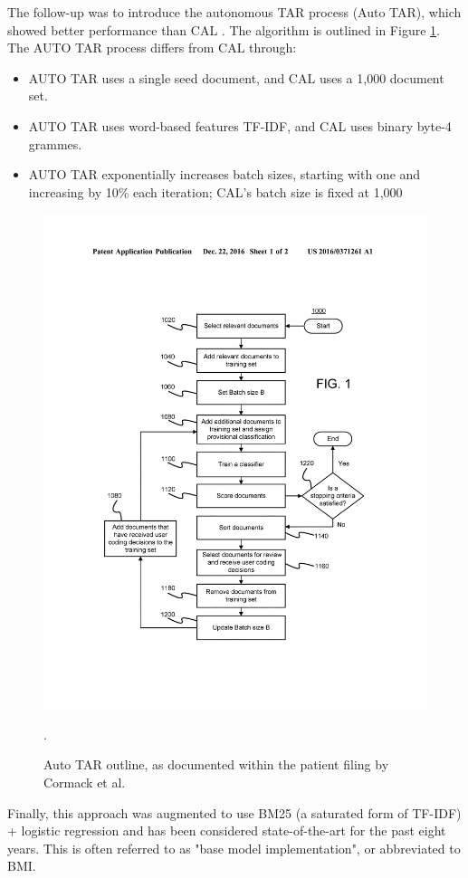 \documentclass[../main.tex]{subfiles}
\begin{document}
The follow-up was to introduce the autonomous TAR process (Auto TAR), which showed better performance than CAL \cite{cormack_autonomy_2015}. The algorithm is outlined in Figure \ref{fig:autotar_process}. 
The AUTO TAR process differs from CAL through:
\begin{itemize}
    \item AUTO TAR uses a single seed document, and CAL uses a 1,000 document set.
    \item AUTO TAR uses word-based features TF-IDF, and CAL uses binary byte-4 grammes.
    \item AUTO TAR exponentially increases batch sizes, starting with one and increasing by 10\% each iteration; CAL's batch size is fixed at 1,000
\end{itemize}

\begin{figure}
    \centering
    \includegraphics[width=1\linewidth]{sections//images/autotar.jpg}
    \caption{Auto TAR outline, as documented within the patient filing by Cormack et al. \cite{cormack_systems_2016}}.
    \label{fig:autotar_process}
\end{figure}
Finally, this approach was augmented to use BM25 (a saturated form of TF-IDF) + logistic regression and has been considered state-of-the-art for the past eight years. This is often referred to as "base model implementation", or abbreviated to BMI.
\end{document}
